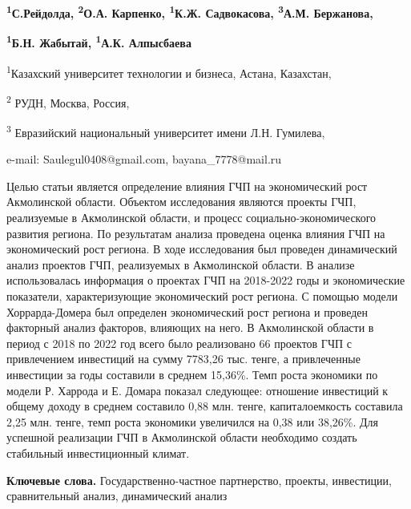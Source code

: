 
\begin{center}
{\bfseries \textsuperscript{1}С.Рейдолда\envelope,
\textsuperscript{2}О.А. Карпенко, \textsuperscript{1}К.Ж. Садвокасова,
\textsuperscript{3}А.М. Бержанова,}

{\bfseries \textsuperscript{1}Б.Н. Жабытай\envelope,
\textsuperscript{1}А.К. Алпысбаева}

\textsuperscript{1}Казахский университет технологии и бизнеса, Астана,
Казахстан,

\textsuperscript{2} РУДН, Москва, Россия,

\textsuperscript{3} Евразийский национальный университет имени Л.Н.
Гумилева,

e-mail: Saulegul0408@gmail.com, bayana\_7778@mail.ru
\end{center}

Целью статьи является определение влияния ГЧП на экономический рост
Акмолинской области. Объектом исследования являются проекты ГЧП,
реализуемые в Акмолинской области, и процесс социально-экономического
развития региона. По результатам анализа проведена оценка влияния ГЧП на
экономический рост региона. В ходе исследования был проведен
динамический анализ проектов ГЧП, реализуемых в Акмолинской области. В
анализе использовалась информация о проектах ГЧП на 2018-2022 годы и
экономические показатели, характеризующие экономический рост региона. С
помощью модели Хоррарда-Домера был определен экономический рост региона
и проведен факторный анализ факторов, влияющих на него. В Акмолинской
области в период с 2018 по 2022 год всего было реализовано 66 проектов
ГЧП с привлечением инвестиций на сумму 7783,26 тыс. тенге, а
привлеченные инвестиции за годы составили в среднем 15,36\%. Темп роста
экономики по модели Р. Харрода и Е. Домара показал следующее: отношение
инвестиций к общему доходу в среднем составило 0,88 млн. тенге,
капиталоемкость составила 2,25 млн. тенге, темп роста экономики
увеличился на 0,38 или 38,26\%. Для успешной реализации ГЧП в
Акмолинской области необходимо создать стабильный инвестиционный климат.

{\bfseries Ключевые слова.} Государственно-частное партнерство, проекты,
инвестиции, сравнительный анализ, динамический анализ


